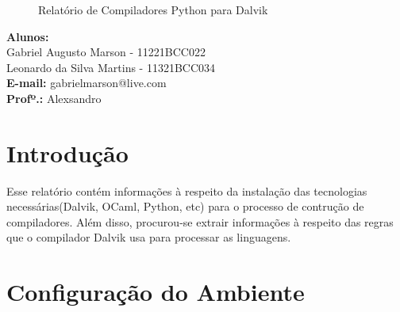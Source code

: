 \documentclass[hidelinks,12pt]{article}
\newcommand{\bigicon}[1]{\texttt{[image: \#1]}}
\begin{document}
\pagestyle{fancy}


\lhead{\bigicon{Figures/ufu}}
\rhead{\bigicon{Figures/facom}}
\lfoot{}
\cfoot{}
\rfoot{}
\vspace*{8.5cm}
\begin{figure}[!h]
	\centering
	\Huge{Relatório de Compiladores Python para Dalvik}
\end{figure}

\vspace{5cm}
\noindent\textbf{Alunos:}\\ Gabriel Augusto Marson - 11221BCC022  \\ Leonardo da Silva Martins - 11321BCC034\\
\textbf{E-mail:} gabrielmarson@live.com\\
\textbf{Profº.:} Alexsandro


\newpage
\fancyhead[C]{}
\fancyhead[R]{}
\fancyhead[L]{\leftmark}
\fancyfoot{}
\fancyfoot[C]{\hspace{1.5cm}\thepage}


{\let\thefootnote\relax{}}

\newpage

\tableofcontents


\newpage

\section{Introdução}

	Esse relatório contém informações à respeito da instalação das tecnologias necessárias(Dalvik, OCaml, Python, etc) para o processo de contrução de compiladores. 
	Além disso, procurou-se extrair informações à respeito das regras que o compilador Dalvik usa para processar as linguagens.
	
\section{Configuração do Ambiente}
\end{document}
